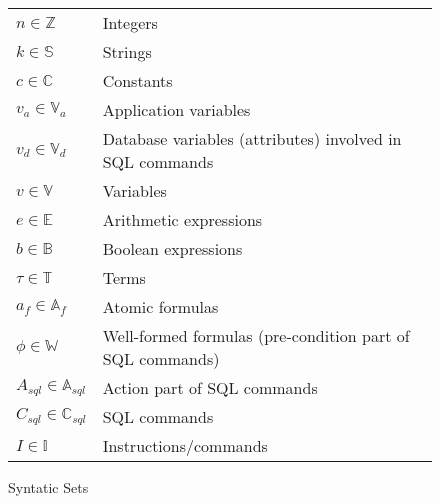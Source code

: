 \begin{figure}[htb!]
     \center
    \begin{tabular}{l l}
    $n \in \mathbb{Z}$                          & Integers                                                   \\
    $k \in \mathbb{S}$                                  & Strings                                                    \\
    $c \in \mathbb{C}$                          & Constants                                                 \\
    $v_a \in \mathbb{V}_a$                      & Application variables                                     \\
    $v_d \in \mathbb{V}_d$                      & Database variables (attributes) involved in SQL commands  \\
    $v \in \mathbb{V}$ & Variables                                                 \\
    $e \in \mathbb{E}$                          & Arithmetic expressions                                    \\
    $b \in \mathbb{B}$                          & Boolean expressions                                       \\
    $\tau \in \mathbb{T}$                       & Terms                                                     \\
    $a_f \in \mathbb{A}_f$                      & Atomic formulas                                           \\
    $\phi  \in \mathbb{W}$                      & Well-formed formulas (pre-condition part of SQL commands) \\
    $A_{sql} \in \mathbb{A}_{sql}$              & Action part of SQL commands                               \\
    $C_{sql} \in \mathbb{C}_{sql}$              & SQL commands                                              \\
    $I \in \mathbb{I}$                          & Instructions/commands                                     \\
    \end{tabular}
    \caption{Syntatic Sets}
    \label{tab:syntatic-sets}
\end{figure}

